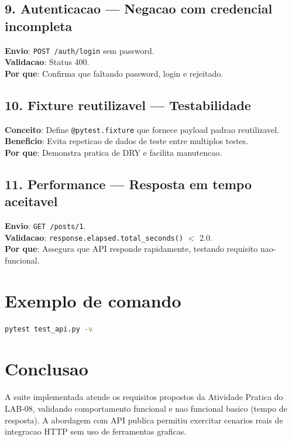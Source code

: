 \documentclass[11pt,a4paper]{article}
\begin{document}
\subsection{9. Autenticacao --- Negacao com credencial incompleta}
\textbf{Envio}: \texttt{POST /auth/login} sem password. \\
\textbf{Validacao}: Status 400. \\
\textbf{Por que}: Confirma que faltando password, login e rejeitado.

\subsection{10. Fixture reutilizavel --- Testabilidade}
\textbf{Conceito}: Define \texttt{@pytest.fixture} que fornece payload padrao reutilizavel. \\
\textbf{Beneficio}: Evita repeticao de dados de teste entre multiplos testes. \\
\textbf{Por que}: Demonstra pratica de DRY e facilita manutencao.

\subsection{11. Performance --- Resposta em tempo aceitavel}
\textbf{Envio}: \texttt{GET /posts/1}. \\
\textbf{Validacao}: \texttt{response.elapsed.total\_seconds()} $<$ 2.0. \\
\textbf{Por que}: Assegura que API responde rapidamente, testando requisito nao-funcional.

\section{Exemplo de comando}
\begin{lstlisting}[language=bash]
pytest test_api.py -v
\end{lstlisting}

\section{Conclusao}
A suite implementada atende os requisitos propostos da Atividade Pratica do LAB-08, validando comportamento funcional e nao funcional basico (tempo de resposta). A abordagem com API publica permitiu exercitar cenarios reais de integracao HTTP sem uso de ferramentas graficas.
\end{document}
